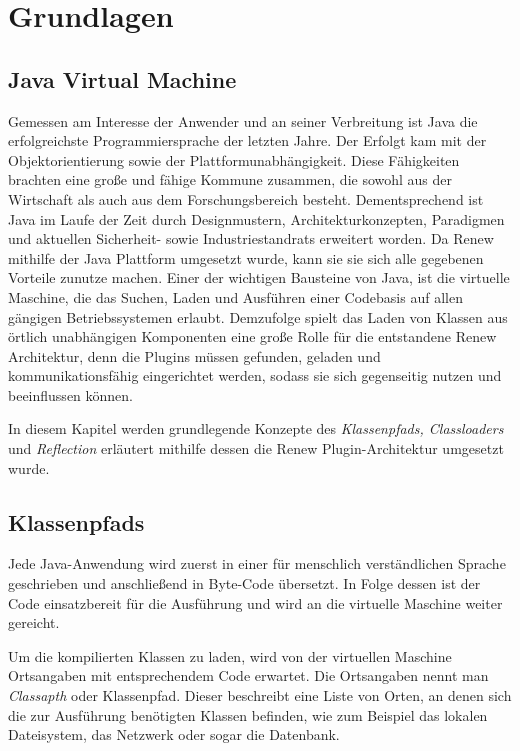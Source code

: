 \chapter{Grundlagen} \label{cha:Grundlagen}

\section{Java Virtual Machine} \label{sec:JVM}

  Gemessen am Interesse der Anwender und an seiner Verbreitung ist Java die erfolgreichste Programmiersprache der letzten Jahre. Der Erfolgt kam mit der Objektorientierung sowie der Plattformunabhängigkeit. Diese Fähigkeiten brachten eine große und fähige Kommune zusammen, die sowohl aus der Wirtschaft als auch aus dem Forschungsbereich besteht. Dementsprechend ist Java im Laufe der Zeit durch Designmustern, Architekturkonzepten, Paradigmen und aktuellen Sicherheit- sowie Industriestandrats erweitert worden. Da Renew mithilfe der Java Plattform umgesetzt wurde, kann sie sie sich alle gegebenen Vorteile zunutze machen. \newline
  Einer der wichtigen Bausteine von Java, ist die virtuelle Maschine, die das Suchen, Laden und Ausführen einer Codebasis auf allen gängigen Betriebssystemen erlaubt. Demzufolge spielt das Laden von Klassen aus örtlich unabhängigen Komponenten eine große Rolle für die entstandene Renew Architektur, denn die Plugins müssen gefunden, geladen und kommunikationsfähig eingerichtet werden, sodass sie sich gegenseitig nutzen und beeinflussen können.\bigbreak

  In diesem Kapitel werden grundlegende Konzepte des \textit{ Klassenpfads, Classloaders} und \textit{Reflection} erläutert mithilfe dessen die Renew Plugin-Architektur umgesetzt wurde.


\section{Klassenpfads} \label{sec:K}

  Jede Java-Anwendung wird zuerst in einer für menschlich verständlichen Sprache geschrieben und anschließend in Byte-Code übersetzt. In Folge dessen ist der Code einsatzbereit für die Ausführung und wird an die virtuelle Maschine weiter gereicht.

  Um die kompilierten Klassen zu laden, wird von der virtuellen Maschine Ortsangaben mit entsprechendem Code erwartet. Die Ortsangaben nennt man \textit{Classapth} oder Klassenpfad. Dieser beschreibt eine Liste von Orten, an denen sich die zur Ausführung benötigten Klassen befinden, wie zum Beispiel das lokalen Dateisystem, das Netzwerk oder sogar die Datenbank. 


